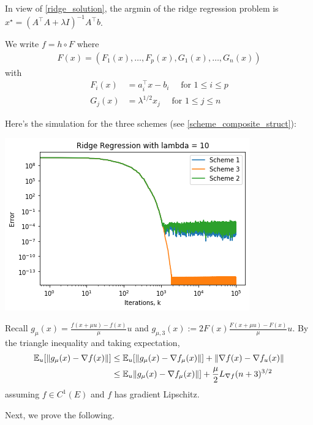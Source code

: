 \documentclass{article}
\begin{document}
In view of \eqref{ridge_solution}, the argmin of the ridge regression problem is $x^{\star} = (A^\top A + \lambda I)^{-1}A^\top b$. \newline 

We write $f = h \circ F$ where 
\begin{align}
F(x) = (F_1(x), \dots, F_p(x), G_1(x), \dots, G_n(x))
\end{align}
with
\begin{align}
F_i(x) & = a_i^\top x - b_i \quad \text{ for } 1 \leq i \leq p \\
G_j(x) & = \lambda^{1/2}x_j \quad \text{ for } 1 \leq j \leq n
\end{align}

Here's the simulation for the three schemes (see \ref{scheme_composite_struct}):

\includegraphics{tex_images/zerothorder_composite_Ridge}

Recall $g_{\mu}(x)= \frac{f(x+\mu u) - f(x)}{\mu}u$ and $g_{\mu,3}(x):= 2F(x)\frac{F(x+\mu u)-F(x)}{\mu}u$. By the triangle inequality and taking expectation,
\begin{align}
\mathbb{E}_u[\| g_{\mu}(x) - \nabla f(x)\|] & \leq \mathbb{E}_u[\|g_{\mu}(x) - \nabla f_{\mu}(x)\|] + \| \nabla f(x) - \nabla f_u(x)\| \notag \\ & \leq \mathbb{E}_u\| g_{\mu}(x) - \nabla f_{\mu}(x)\|] + \frac{\mu}{2}L_{\nabla f}(n+3)^{3/2}
\end{align}
assuming $f \in C^1(E)$ and $f$ has gradient Lipschitz. \newline 

Next, we prove the following.
\end{document}
